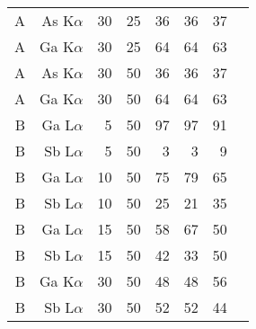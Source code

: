 \begin{table}[phtb]
\begin{center}
\begin{tabular}{rrrrrrrr}
            A               & As K$\alpha$  & 30             & 25             & 36                          & 36                                 & 37                           \\
            A               & Ga K$\alpha$  & 30             & 25             & 64                          & 64                                 & 63                           \\
            A               & As K$\alpha$  & 30             & 50             & 36                          & 36                                 & 37                           \\
            A               & Ga K$\alpha$  & 30             & 50             & 64                          & 64                                 & 63                           \\
            \hline
            B               & Ga L$\alpha$  & 5              & 50             & 97                          & 97                                 & 91                           \\
            B               & Sb L$\alpha$  & 5              & 50             & 3                           & 3                                  & 9                            \\
            B               & Ga L$\alpha$  & 10             & 50             & 75                          & 79                                 & 65                           \\
            B               & Sb L$\alpha$  & 10             & 50             & 25                          & 21                                 & 35                           \\
            B               & Ga L$\alpha$  & 15             & 50             & 58                          & 67                                 & 50                           \\
            B               & Sb L$\alpha$  & 15             & 50             & 42                          & 33                                 & 50                           \\
            B               & Ga K$\alpha$  & 30             & 50             & 48                          & 48                                 & 56                           \\
            B               & Sb L$\alpha$  & 30             & 50             & 52                          & 52                                 & 44                           \\

\end{tabular}
\end{center}
\end{table}
